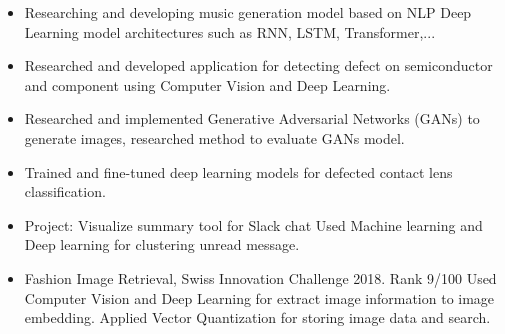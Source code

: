 \documentclass[10pt,a4paper,normalphoto]{altacv}
\begin{document}
\justify
\begin{itemize}
\item 
Researching and developing music generation model based on NLP Deep Learning model architectures such as RNN, LSTM, Transformer,... 
\smallskip
\end{itemize}
\divider
{}
\justify
\begin{itemize}
\item 
Researched and developed application for detecting defect on semiconductor and component using Computer Vision and Deep Learning.
\smallskip
\item
Researched and implemented Generative Adversarial Networks (GANs) to generate images, researched method to evaluate GANs model.

\smallskip
\item
Trained and fine-tuned deep learning models for defected contact lens classification.
\end{itemize}

\divider
{}

\begin{itemize}
\item
Project: Visualize summary tool for Slack chat
\newline
Used Machine learning and Deep learning for clustering unread message.
\end{itemize}

{}
\smallskip

\begin{itemize}
\item Fashion Image Retrieval, Swiss Innovation Challenge 2018. Rank 9/100
\newline
Used Computer Vision and Deep Learning for extract image information to image embedding.
\newline
Applied Vector Quantization for storing image data and search.

\smallskip
\end{itemize}






\end{document}
